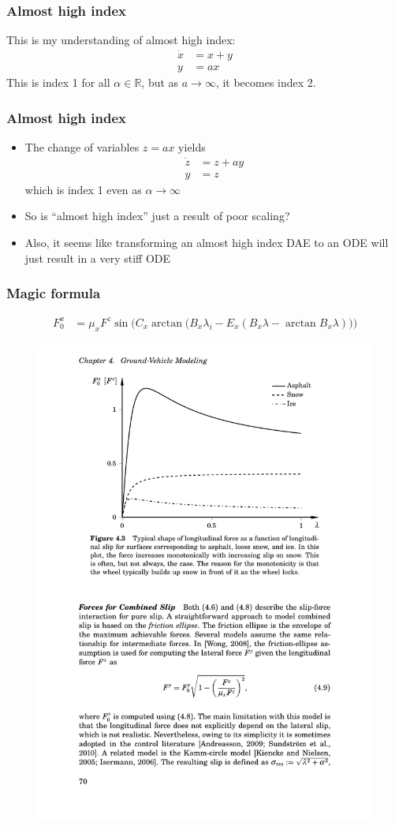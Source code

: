 \documentclass[]{beamer}
\begin{document}
\begin{frame}
\frametitle{Almost high index}
This is my understanding of almost high index:
\begin{align}
\dot x &= x + y \\
y &= ax
\end{align}
This is index 1 for all $\alpha \in \mathbb{R}$, but as $a \rightarrow \infty$, it becomes index 2.
\end{frame}

\begin{frame}
\frametitle{Almost high index}
\begin{itemize}
\item
The change of variables $z = ax$ yields
\begin{align}
\dot z &= z + ay \\
y &= z
\end{align}
which is index 1 even as $\alpha \rightarrow \infty$
\item
So is ``almost high index'' just a result of poor scaling?
\item
Also, it seems like transforming an almost high index DAE to an ODE will just result in a very stiff ODE
\end{itemize}
\end{frame}

\begin{frame}
    \frametitle{Magic formula}
	\begin{align}
		F^x_{0} &= \mu_x F^z 
		\sin\Big( C_{x} 
		\arctan\big(B_{x} \lambda_i -E_{x}(B_{x}\lambda-\arctan B_{x}\lambda)\big)\Big)
	\end{align}
	\begin{figure}[H]
	\centering
	\includegraphics[width=0.7\linewidth]{magic_formula.pdf}
	\end{figure}
\end{frame}
\end{document}

